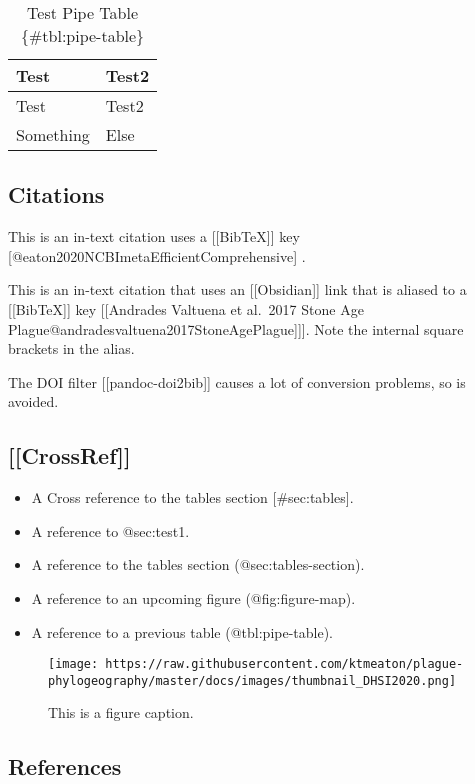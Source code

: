 \documentclass[
]{article}
\providecommand{\tightlist}{%
  \setlength{\itemsep}{0pt}\setlength{\parskip}{0pt}}
\begin{document}
\begin{longtable}[]{@{}ll@{}}
\caption{Test Pipe Table \{\#tbl:pipe-table\}}\tabularnewline
\toprule
Test & Test2\tabularnewline
\midrule
\endfirsthead
\toprule
Test & Test2\tabularnewline
\midrule
\endhead
Something & Else\tabularnewline
\bottomrule
\end{longtable}

\hypertarget{citations}{%
\subsection{Citations}\label{citations}}

This is an in-text citation uses a {[}{[}BibTeX{]}{]} key
{[}@eaton2020NCBImetaEfficientComprehensive{]} .

This is an in-text citation that uses an {[}{[}Obsidian{]}{]} link that
is aliased to a {[}{[}BibTeX{]}{]} key {[}{[}Andrades Valtuena et
al.~2017 Stone Age
Plague\textbar{}{[}@andradesvaltuena2017StoneAgePlague{]}{]}{]}. Note
the internal square brackets in the alias.

The DOI filter {[}{[}pandoc-doi2bib{]}{]} causes a lot of conversion
problems, so is avoided.

\hypertarget{sec:test1}{%
\subsection{{[}{[}CrossRef{]}{]}}\label{sec:test1}}

\begin{itemize}
\tightlist
\item
  A Cross reference to the tables section {[}\#sec:tables{]}.
\item
  A reference to @sec:test1.
\item
  A reference to the tables section (@sec:tables-section).
\item
  A reference to an upcoming figure (@fig:figure-map).
\item
  A reference to a previous table (@tbl:pipe-table).
\end{itemize}

\begin{figure}
\hypertarget{fig:figure-map}{%
\centering
\texttt{[image: https://raw.githubusercontent.com/ktmeaton/plague-phylogeography/master/docs/images/thumbnail\_DHSI2020.png]}
\caption{This is a figure caption.}\label{fig:figure-map}
}
\end{figure}

\hypertarget{references}{%
\subsection{References}\label{references}}
\end{document}
